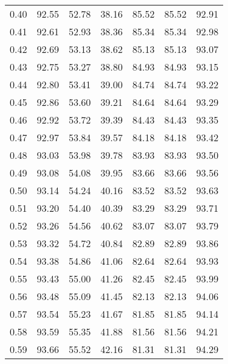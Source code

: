 \begin{tabular}{|c|c|c|c|c|c|c|}
      0.40 &     92.55 &     52.78 &      38.16 &   85.52 &      85.52 &         92.91 \\
      0.41 &     92.61 &     52.93 &      38.36 &   85.34 &      85.34 &         92.98 \\
      0.42 &     92.69 &     53.13 &      38.62 &   85.13 &      85.13 &         93.07 \\
      0.43 &     92.75 &     53.27 &      38.80 &   84.93 &      84.93 &         93.15 \\
      0.44 &     92.80 &     53.41 &      39.00 &   84.74 &      84.74 &         93.22 \\
      0.45 &     92.86 &     53.60 &      39.21 &   84.64 &      84.64 &         93.29 \\
      0.46 &     92.92 &     53.72 &      39.39 &   84.43 &      84.43 &         93.35 \\
      0.47 &     92.97 &     53.84 &      39.57 &   84.18 &      84.18 &         93.42 \\
      0.48 &     93.03 &     53.98 &      39.78 &   83.93 &      83.93 &         93.50 \\
      0.49 &     93.08 &     54.08 &      39.95 &   83.66 &      83.66 &         93.56 \\
      0.50 &     93.14 &     54.24 &      40.16 &   83.52 &      83.52 &         93.63 \\
      0.51 &     93.20 &     54.40 &      40.39 &   83.29 &      83.29 &         93.71 \\
      0.52 &     93.26 &     54.56 &      40.62 &   83.07 &      83.07 &         93.79 \\
      0.53 &     93.32 &     54.72 &      40.84 &   82.89 &      82.89 &         93.86 \\
      0.54 &     93.38 &     54.86 &      41.06 &   82.64 &      82.64 &         93.93 \\
      0.55 &     93.43 &     55.00 &      41.26 &   82.45 &      82.45 &         93.99 \\
      0.56 &     93.48 &     55.09 &      41.45 &   82.13 &      82.13 &         94.06 \\
      0.57 &     93.54 &     55.23 &      41.67 &   81.85 &      81.85 &         94.14 \\
      0.58 &     93.59 &     55.35 &      41.88 &   81.56 &      81.56 &         94.21 \\
      0.59 &     93.66 &     55.52 &      42.16 &   81.31 &      81.31 &         94.29 \\

\end{tabular}
